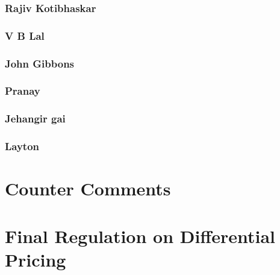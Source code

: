 \documentclass{article}
\begin{document}
\subsubsection{Rajiv Kotibhaskar}


\subsubsection{V B Lal}


\subsubsection{John Gibbons}


\subsubsection{Pranay}


\subsubsection{Jehangir gai}


\subsubsection{Layton}


\section{Counter Comments}
\section{Final Regulation on Differential Pricing}
\end{document}
